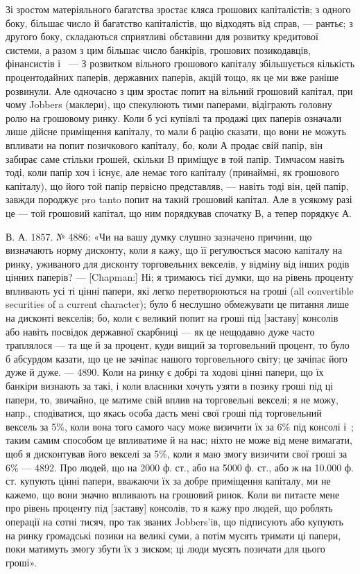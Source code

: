 Зі зростом матеріяльного багатства зростає кляса грошових капіталістів;
з одного боку, більшає число й багатство капіталістів, що відходять від справ, —
рантьє; з другого боку, складаються сприятливі обставини для розвитку кредитової
системи, а разом з цим більшає число банкірів, грошових позикодавців, фінансистів
і~ — З розвитком вільного грошового капіталу збільшується кількість
процентодайних паперів, державних паперів, акцій тощо, як це ми вже раніше
розвинули. Але одночасно з цим зростає попит на вільний грошовий капітал, при
чому Jobbers (маклери), що спекулюють тими паперами, відіграють головну ролю на
грошовому ринку. Коли б усі купівлі та продажі цих паперів означали лише
дійсне приміщення капіталу, то мали б рацію сказати, що вони не можуть
впливати на попит позичкового капіталу, бо, коли А продає свій папір, він
забирає саме стільки грошей, скільки B приміщує в той папір. Тимчасом навіть
тоді, коли папір хоч і існує, але немає того капіталу (принаймні, як грошового
капіталу), що його той папір первісно представляв, — навіть тоді він, цей папір,
завжди породжує pro tanto попит на такий грошовий капітал. Але в усякому
разі це — той грошовий капітал, що ним порядкував спочатку В, а тепер
порядкує А.

В. А. 1857. № 4886: «Чи на вашу думку слушно зазначено причини,
що визначають норму дисконту, коли я кажу, що її регулюється масою капіталу
на ринку, уживаного для дисконту торговельних векселів, у відміну від
інших родів цінних паперів? — [Chapman:] Ні; я тримаюсь тієї думки, що на
рівень проценту впливають усі ті цінні папери, які легко перетворюються
на гроші (all convertible securities of a current character); було б неслушно
обмежувати це питання лише на дисконті векселів; бо, коли є великий попит
на гроші під [заставу] консолів або навіть посвідок державної скарбниці — як
це нещодавно дуже часто траплялося — та ще й за процент, куди вищий за
торговельний процент, то було б абсурдом казати, що це не зачіпає нашого торговельного
світу; це зачіпає його дуже й дуже. — 4890. Коли на ринку є добрі
та ходові цінні папери, що їх банкіри визнають за такі, і коли власники
хочуть узяти в позику гроші під ці папери, то, звичайно, це матиме свій вплив на
торговельні векселі; я не можу, напр., сподіватися, що якась особа дасть мені
свої гроші під торговельний вексель за 5\%, коли вона того самого часу може
визичити їх за 6\% під консолі і~; таким самим способом це впливатиме й на
нас; ніхто не може від мене вимагати, щоб я дисконтував його векселі за 5\%,
коли я маю змогу визичити свої гроші за 6\% — 4892. Про людей, що на 2000
ф. ст., або на 5000 ф. ст., або ж на \num{10.000} ф. ст. купують цінні папери, вважаючи
їх за добре приміщення капіталу, ми не кажемо, що вони значно впливають
на грошовий ринок. Коли ви питаєте мене про рівень проценту під [заставу]
консолів, то я кажу про людей, що роблять операції на сотні тисяч, про так
званих Jobbers’iв, що підписують або купують на ринку громадські позики на
великі суми, а потім мусять тримати ці папери, поки матимуть змогу збути їх
з зиском; ці люди мусять позичати для цього гроші».


